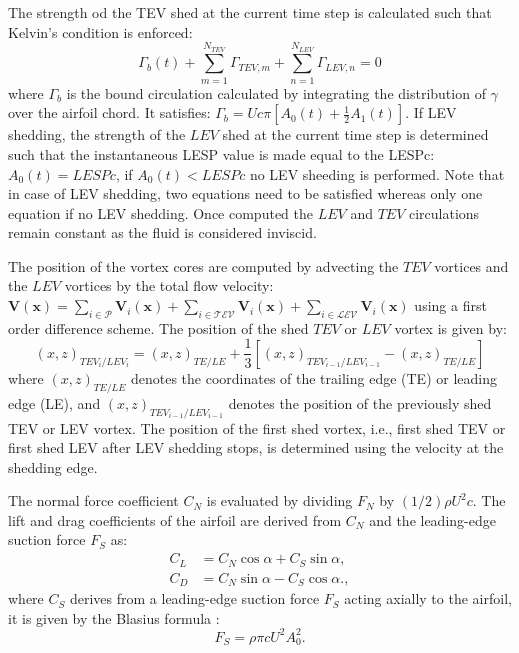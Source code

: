 \documentclass[a4paper,12pt]{article}
\begin{document}
The strength od the TEV shed at the current time step is calculated such that Kelvin’s condition is enforced:
\begin{equation}
    \Gamma_b(t) + \sum_{m=1}^{N_{TEV}} \Gamma_{TEV,m} + \sum_{n=1}^{N_{LEV}} \Gamma_{LEV,n} = 0
    \label{eq:kelvin_circulation}
\end{equation}
where $\Gamma_b$ is the bound circulation calculated by integrating the distribution of $\gamma$ over the airfoil chord. It satisfies:
    $\Gamma_b = U c \pi \left[ A_0(t) + \frac{1}{2} A_1(t) \right]$.
If LEV shedding, the strength  of the $LEV$ shed at the current time step is determined such that  the instantaneous LESP value is made equal to the LESPc: $A_0(t)=LESPc$, if $A_0(t)<LESPc$ no LEV sheeding is performed.
Note that in case of LEV shedding, two equations need to be satisfied whereas only one equation if no LEV shedding.
Once computed the $LEV$ and $TEV$ circulations remain constant as the fluid is considered inviscid.

The position of the vortex cores are computed by advecting the $TEV$ vortices and the $LEV$ vortices  by the 
total flow velocity: $\textbf{V}(\textbf{x})= \sum_{i\in \mathcal{P}} \textbf{V}_{i}(\textbf{x}) + \sum_{i\in \mathcal{TEV}} \textbf{V}_{i}(\textbf{x}) + \sum_{i\in \mathcal{LEV}} \textbf{V}_{i}(\textbf{x})$ using a first order difference scheme.
The position of the shed $TEV$ or $LEV$ vortex is given by:
\begin{equation}
    (x, z)_{TEV_i/LEV_i} = (x, z)_{TE/LE} + \frac{1}{3} \left[ (x, z)_{TEV_{i-1}/LEV_{i-1}} - (x, z)_{TE/LE} \right]
\end{equation}
where $(x, z)_{TE/LE}$ denotes the coordinates of the trailing edge (TE) or leading edge (LE), and $(x, z)_{TEV_{i-1}/LEV_{i-1}}$ denotes the position of the previously shed TEV or LEV vortex. The position of the first shed vortex, i.e., first shed TEV or first shed LEV after LEV shedding stops, is determined using the velocity at the shedding edge.



The normal force coefficient $C_N$ is evaluated by dividing $F_N$ by $(1/2)\rho U^2 c$. The lift and drag coefficients of the airfoil are derived from $C_N$ and the leading-edge suction force $F_S$ as:
\begin{align}
    C_L &= C_N \cos\alpha + C_S \sin\alpha, \label{eq:CL}\\
    C_D &= C_N \sin\alpha - C_S \cos\alpha. \label{eq:CD},
\end{align}
where $C_S$ derives from a leading-edge suction force $F_S$ acting axially to the airfoil, it is given by the Blasius formula \citep{ramesh2014discrete}:
\begin{equation}
    F_S = \rho \pi c U^2 A_0^2.
    \label{eq:FS_blasius}
\end{equation}
\end{document}
